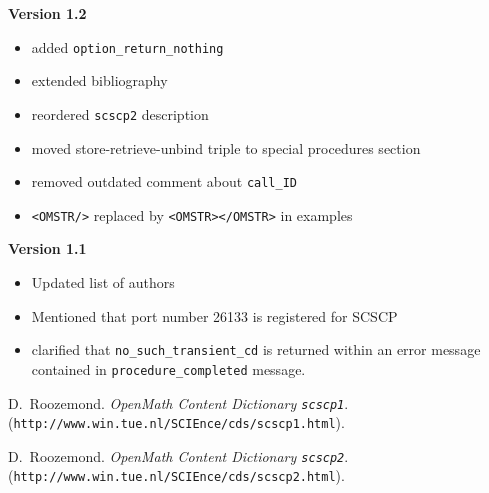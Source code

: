 \documentclass{amsart}
\begin{document}
\vspace{5pt}

{\bf Version 1.2}
\begin{itemize}
\item added \texttt{option\_return\_nothing}
\item extended bibliography
\item reordered \texttt{scscp2} description
\item moved store-retrieve-unbind triple to special procedures section
\item removed outdated comment about \texttt{call\_ID}
\item \texttt{<OMSTR/>} replaced by \texttt{<OMSTR></OMSTR>} in examples
\end{itemize}	

\vspace{5pt}

{\bf Version 1.1}
\begin{itemize}
\item Updated list of authors
\item Mentioned that port number 26133 is registered for SCSCP
\item clarified that \texttt{no\_such\_transient\_cd} is returned within an error message contained in \texttt{procedure\_completed} message.
\end{itemize}

\newpage

\begin{thebibliography}{10}

D.~Roozemond. {\it OpenMath Content Dictionary {\tt scscp1}}.
(\verb+http://www.win.tue.nl/SCIEnce/cds/scscp1.html+).

D.~Roozemond. {\it OpenMath Content Dictionary {\tt scscp2}}.
(\verb+http://www.win.tue.nl/SCIEnce/cds/scscp2.html+).

\end{thebibliography}
\end{document}
